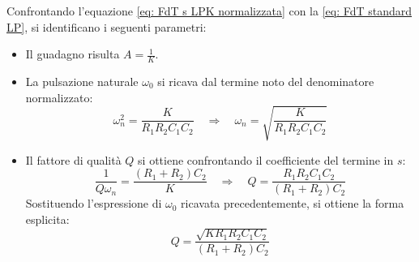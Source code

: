 Confrontando l'equazione \ref{eq: FdT s LPK normalizzata} con la \ref{eq: FdT standard LP}, si identificano i seguenti parametri:
\begin{itemize}
    \item Il guadagno risulta $A = \frac{1}{K}$.
    \item La pulsazione naturale $\omega_0$ si ricava dal termine noto del denominatore normalizzato:
    \begin{equation}
        \omega_n^2 = \frac{K}{R_1R_2 C_1 C_2} \quad \Rightarrow \quad \omega_n = \sqrt{\frac{K}{R_1R_2 C_1 C_2}}
        \label{eq: omega0 LPK}
    \end{equation}
    \item Il fattore di qualità $Q$ si ottiene confrontando il coefficiente del termine in $s$:
    \begin{equation}
        \frac{1}{Q\omega_n} = \frac{(R_1+R_2)C_2}{K} \quad \Rightarrow \quad Q = \frac{R_1R_2 C_1 C_2}{(R_1+R_2)C_2}
    \end{equation}
    Sostituendo l'espressione di $\omega_0$ ricavata precedentemente, si ottiene la forma esplicita:
    \begin{equation}
        Q = \frac{\sqrt{K R_1R_2 C_1 C_2}}{(R_1+R_2)C_2}
        \label{eq: Q LPK}
    \end{equation}
\end{itemize}